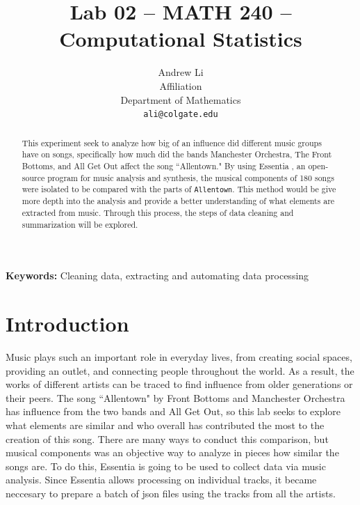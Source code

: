 \documentclass{article}\usepackage[]{graphicx}\usepackage[]{xcolor}
\begin{document}
\vspace{-1in}
\title{Lab 02 -- MATH 240 -- Computational Statistics}

\author{
  Andrew Li \\
  Affiliation  \\
  Department of Mathematics  \\
  {\tt ali@colgate.edu}
}

\date{}

\maketitle

\begin{multicols}{2}
\begin{abstract}
This experiment seek to analyze how big of an influence did different music groups have on songs, specifically how much did the bands Manchester Orchestra, The Front Bottoms, and All Get Out affect the song ``Allentown." By using Essentia \citep{bogdanov2013essentia}, an open-source program for music analysis and synthesis, the musical components of 180 songs were isolated to be compared with the parts of \texttt{Allentown}. This method would be give more depth into the analysis and provide a better understanding of what elements are extracted from music. Through this process, the steps of data cleaning and summarization will be explored.  

\end{abstract}

\noindent \textbf{Keywords:} Cleaning data, extracting and automating data processing 

\section{Introduction}

Music plays such an important role in everyday lives, from creating social spaces, providing an outlet, and connecting people throughout the world. As a result, the works of different artists can be traced to find influence from older generations or their peers. The song ``Allentown" by Front Bottoms and Manchester Orchestra has influence from the two bands and All Get Out, so this lab seeks to explore what elements are similar and who overall has contributed the most to the creation of this song. There are many ways to conduct this comparison, but musical components was an objective way to analyze in pieces how similar the songs are. To do this, Essentia \citep{bogdanov2013essentia} is going to be used to collect data via music analysis. Since Essentia allows processing on individual tracks, it became neccesary to prepare a batch of json files using the tracks from all the artists. 




\end{multicols}
\end{document}
